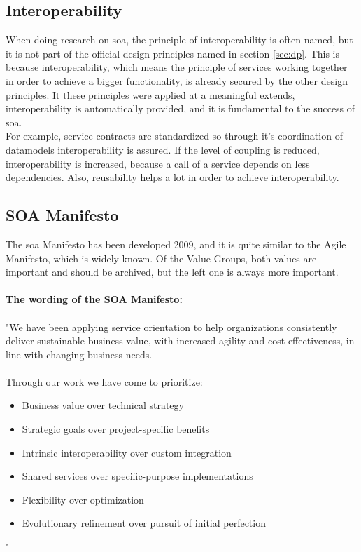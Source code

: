 \documentclass[12pt]{article}
\begin{document}
\subsection{Interoperability}
When doing research on \gls{soa}, the principle of interoperability is often named, but it is not part of the official design principles named in section \ref{sec:dp}. This is because interoperability, which means the principle of services working together in order to achieve a bigger functionality, is already secured by the other design principles. It these principles were applied at a meaningful extends, interoperability is automatically provided, and it is fundamental to the success of \gls{soa}.\\
For example, service contracts are standardized so through it's coordination of datamodels interoperability is assured. If the level of coupling is reduced, interoperability is increased, because a call of a service depends on less dependencies. Also, reusability helps a lot in order to achieve interoperability. \cite[page 89-90]{te}
\subsection{SOA Manifesto}
The \gls{soa} Manifesto has been developed 2009, and it is quite similar to the Agile Manifesto, which is widely known. Of the Value-Groups, both values are important and should be archived, but the left one is always more important. \\ \\
\textbf{The wording of the SOA Manifesto:}\\ \\
"We have been applying service orientation to help organizations 
consistently deliver sustainable business value, with increased agility
and cost effectiveness, in line with changing business needs. \\ \\
Through our work we have come to prioritize: \\
\begin{itemize}
\item Business value over technical strategy 
\item Strategic goals over project-specific benefits 
\item Intrinsic interoperability over custom integration 
\item Shared services over specific-purpose implementations 
\item Flexibility over optimization
\item Evolutionary refinement over pursuit of initial perfection
\end{itemize}" \cite{soamaifesto} 
\end{document}
